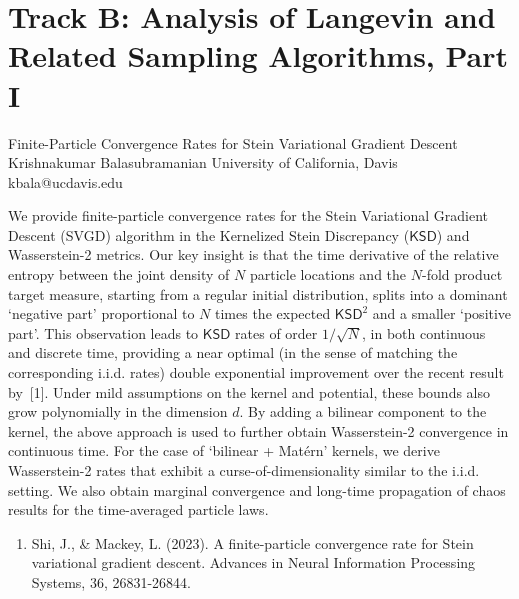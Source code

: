 \section{Track B: Analysis of Langevin and Related Sampling Algorithms, Part I}\newpage

\begin{talk}
  {Finite-Particle Convergence Rates for Stein Variational Gradient Descent}%
  {Krishnakumar Balasubramanian}%
  {University of California, Davis}%
  {kbala@ucdavis.edu}%
  {}%
  
    
   
 We provide finite-particle convergence rates for the Stein Variational Gradient Descent (SVGD) algorithm in the Kernelized Stein Discrepancy ($\mathsf{KSD}$) and Wasserstein-2 metrics. Our key insight is that the time derivative of the relative entropy between the joint density of $N$ particle locations and the $N$-fold product target measure, starting from a regular initial distribution, splits into a dominant `negative part' proportional to $N$ times the expected $\mathsf{KSD}^2$ and a smaller `positive part'. This observation leads to $\mathsf{KSD}$ rates of order $1/\sqrt{N}$, in both continuous and discrete time, providing a near optimal (in the sense of matching the corresponding i.i.d. rates) double exponential improvement over the recent result by~[1]. Under mild assumptions on the kernel and potential, these bounds also grow polynomially in the dimension $d$. By adding a bilinear component to the kernel, the above approach is used to further obtain Wasserstein-2 convergence in continuous time. For the case of `bilinear + Mat\'ern' kernels, we derive Wasserstein-2 rates that exhibit a curse-of-dimensionality similar to the i.i.d. setting. We also obtain marginal convergence and long-time propagation of chaos results for the time-averaged particle laws. 

\medskip


\begin{enumerate}
 \item[{[1]}] Shi, J., \& Mackey, L. (2023). A finite-particle convergence rate for Stein variational gradient descent. Advances in Neural Information Processing Systems, 36, 26831-26844.
\end{enumerate}

\end{talk}

